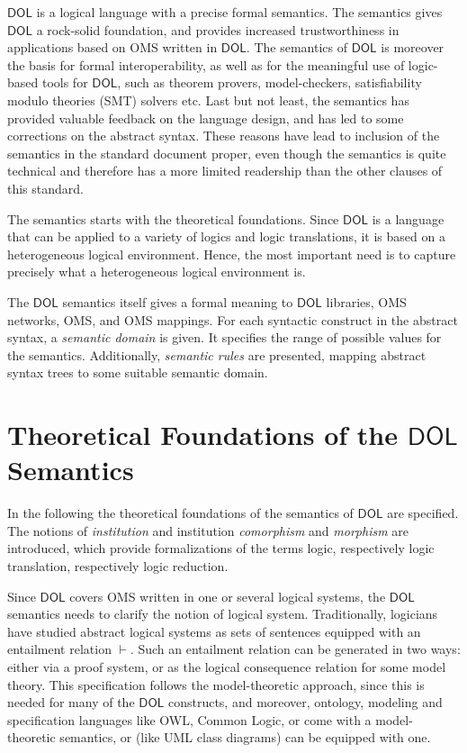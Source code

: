 \documentclass[10pt,fleqn,final]{scrreprt}
\newcommand*{\termref}[1]{\index{#1}#1\xspace}
\newcommand*{\DOL}{\ensuremath{\mathsf{DOL}}\xspace}
\newcommand{\sclause}[1]{\section{#1}}
\newenvironment{definitions}[0]{\medskip }{}
\begin{document}
\begin{definitions}
\DOL is a logical language with a precise formal semantics.  The
semantics gives \DOL a rock-solid foundation, and provides increased
trustworthiness in applications based on OMS written in \DOL.  The
semantics of \DOL is moreover the basis for formal interoperability, as
well as for the meaningful use of logic-based tools for \DOL, such as
theorem provers, model-checkers, satisfiability modulo theories (SMT) solvers etc.  Last but not least,
the semantics has provided valuable feedback on the language design,
and has led to some corrections on the abstract syntax.  These
reasons have lead to inclusion of the semantics in the standard
document proper, even though the semantics is quite technical and
therefore has a more limited readership than the other clauses of
this standard.

The semantics starts with the theoretical foundations. Since \DOL is a
language that can be applied to a variety of logics and logic
translations, it is based on a heterogeneous logical environment.
Hence, the most important need is to capture precisely what a
heterogeneous logical environment is.

The \DOL semantics itself gives a formal meaning to \DOL libraries, OMS
networks, OMS, and OMS mappings. For each syntactic construct
in the abstract syntax,
a \emph{semantic domain} is given. It specifies the range of possible
values for the semantics. Additionally, \emph{semantic rules} are
presented, mapping abstract syntax trees to some suitable semantic
domain.

\sclause{Theoretical Foundations of the \DOL Semantics}
\label{s:foundations}

 In the following the theoretical foundations of the semantics of \DOL are  specified.
The notions of \emph{institution} and institution 
\emph{comorphism} and \emph{morphism} are introduced, which provide formalizations of the terms 
\termref{logic}, respectively \termref{logic translation}, respectively  \termref{logic reduction}. 

Since \DOL covers OMS written in one or several logical systems, the
\DOL semantics needs to clarify the notion of logical
system. Traditionally, logicians have studied abstract logical systems
as sets of sentences equipped with an entailment relation
$\vdash$. Such an entailment relation can be generated in two ways:
either via a proof system, or as the logical consequence relation for
some model theory.  This specification follows the model-theoretic approach, since
this is needed for many of the \DOL constructs, and moreover, ontology,
modeling and specification languages like OWL, Common Logic, or \CASL
come with a model-theoretic semantics, or (like UML class diagrams)
can be equipped with one.


\end{definitions}
\end{document}

